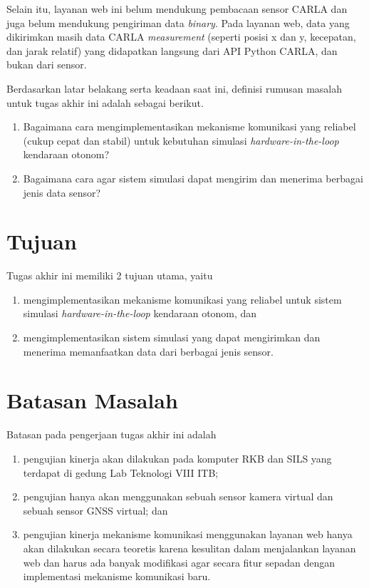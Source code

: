 Selain itu, layanan web ini belum mendukung pembacaan sensor CARLA dan juga
belum mendukung pengiriman data \textit{binary}. Pada layanan web, data yang
dikirimkan masih data CARLA \textit{measurement} (seperti posisi x dan y,
kecepatan, dan jarak relatif) yang didapatkan langsung dari API Python CARLA,
dan bukan dari sensor.

Berdasarkan latar belakang serta keadaan saat ini, definisi rumusan masalah
untuk tugas akhir ini adalah sebagai berikut.
\begin{enumerate}
	\item Bagaimana cara mengimplementasikan mekanisme komunikasi yang reliabel
		(cukup cepat dan stabil) untuk kebutuhan simulasi
		\textit{hardware-in-the-loop} kendaraan otonom?
	\item Bagaimana cara agar sistem simulasi dapat mengirim dan menerima
		berbagai jenis data sensor?
\end{enumerate}

\section{Tujuan}

Tugas akhir ini memiliki 2 tujuan utama, yaitu
\begin{enumerate}
	\item mengimplementasikan mekanisme komunikasi yang reliabel untuk sistem
		simulasi \textit{hardware-in-the-loop} kendaraan otonom, dan
	\item mengimplementasikan sistem simulasi yang dapat mengirimkan dan
		menerima memanfaatkan data dari berbagai jenis sensor.
\end{enumerate}

\section{Batasan Masalah}

Batasan pada pengerjaan tugas akhir ini adalah

\begin{enumerate}
	\item pengujian kinerja akan dilakukan pada komputer RKB dan SILS yang
		terdapat di gedung Lab Tek\-no\-lo\-gi VIII ITB;
	\item pengujian hanya akan menggunakan sebuah sensor kamera virtual dan
		sebuah sensor GNSS virtual; dan
	\item pengujian kinerja mekanisme komunikasi menggunakan layanan web hanya akan
		dilakukan secara teoretis karena kesulitan dalam menjalankan layanan web
		dan harus ada banyak modifikasi agar secara fitur sepadan dengan
		implementasi mekanisme komunikasi baru.
\end{enumerate}

